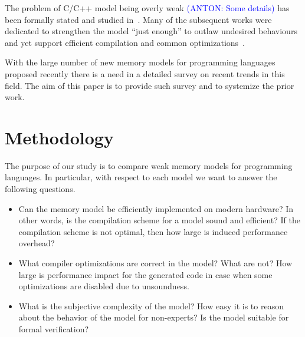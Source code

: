 \documentclass[a4paper,twoside,11pt]{article}
\newcommand{\app}[1]{\textcolor{blue}{(ANTON: #1)}}
\numberwithin{equation}{section}
\begin{document}
The problem of C/C++ model being overly weak \app{Some details} has 
been formally stated and studied in~\cite{Batty-al:ESOP15}.
Many of the subsequent works were dedicated 
to strengthen the model ``just enough'' to outlaw undesired behaviours
and yet support efficient compilation and 
common optimizations~\cite{Jeffrey-Riely:LICS16, PichonPharabod-Sewell:POPL16, 
Podkopaev-al:CoRR16, Kang-al:POPL17, Chakraborty-Vafeiadis:POPL19, Lee-el:PLDI20}. 

With the large number of new memory models for programming languages
proposed recently there is a need in a detailed survey on recent trends in this field.
The aim of this paper is to provide such survey and to systemize the prior work.
 

\section{Methodology}

The purpose of our study is to compare weak memory models for programming languages.
In particular, with respect to each model we want to answer the following questions.


\begin{itemize}
  
  \item Can the memory model be efficiently implemented on modern hardware? 
    In other words, is the compilation scheme for a model sound and efficient?
    If the compilation scheme is not optimal, then how large is induced performance overhead?

  \item What compiler optimizations are correct in the model? What are not? 
    How large is performance impact for the generated code in case when 
    some optimizations are disabled due to unsoundness.

  \item What is the subjective complexity of the model?
    How easy it is to reason about the behavior of the model for non-experts?
    Is the model suitable for formal verification?
  
\end{itemize}
\end{document}
